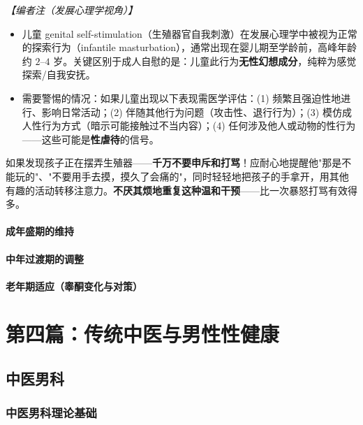 \vspace{0.3em}
\noindent\textit{【编者注（发展心理学视角）】}
\begin{itemize}
	\item 儿童 genital self-stimulation（生殖器官自我刺激）在发展心理学中被视为正常的探索行为（infantile masturbation），通常出现在婴儿期至学龄前，高峰年龄约 $2$--$4$ 岁。关键区别于成人自慰的是：儿童此行为\textbf{无性幻想成分}，纯粹为感觉探索/自我安抚。
	\item 需要警惕的情况：如果儿童出现以下表现需医学评估：(1) 频繁且强迫性地进行、影响日常活动；(2) 伴随其他行为问题（攻击性、退行行为）；(3) 模仿成人性行为方式（暗示可能接触过不当内容）；(4) 任何涉及他人或动物的性行为——这些可能是\textbf{性虐待}的信号。
\end{itemize}

\begin{tcolorbox}[colback=pink!5!white,colframe=red!50!black,title=贴心小叮咛]
如果发现孩子正在摆弄生殖器——\textbf{千万不要申斥和打骂}！应耐心地提醒他"那是不能玩的"、"不要用手去摸，摸久了会痛的"，同时轻轻地把孩子的手拿开，用其他有趣的活动转移注意力。\textbf{不厌其烦地重复这种温和干预}——比一次暴怒打骂有效得多。
\end{tcolorbox}

\subsection{成年盛期的维持}
\subsection{中年过渡期的调整}
\subsection{老年期适应（睾酮变化与对策）}

\part{第四篇：传统中医与男性性健康}

\chapter{中医男科}

\section{中医男科理论基础}
